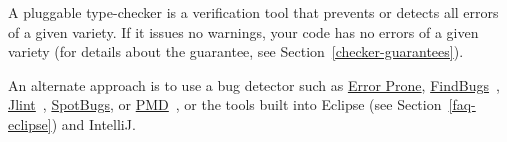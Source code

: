 




A pluggable type-checker
is a verification tool that prevents or detects all errors of a given
variety.  If it issues no warnings, your code has no errors of a given
variety (for details about the guarantee, see
Section~\ref{checker-guarantees}).

An alternate approach is to use a bug detector such as
\href{https://errorprone.info/}{Error Prone},
\href{http://findbugs.sourceforge.net/}{FindBugs}~\cite{HovemeyerP2004,HovemeyerSP2005},
\href{http://jlint.sourceforge.net/}{Jlint}~\cite{Artho2001},
\href{https://github.com/spotbugs/spotbugs}{SpotBugs},
or
\href{https://pmd.github.io/}{PMD}~\cite{Copeland2005},
or the
tools built into Eclipse (see Section~\ref{faq-eclipse}) and IntelliJ\@.

